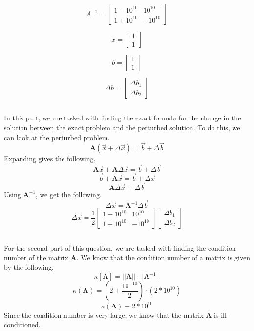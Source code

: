 \documentclass{article}
\begin{document}
\[
A^{-1} =
\begin{bmatrix}
    1-10^{10}& 10^{10} \\
    1+10^{10} & -10^{10}
\end{bmatrix}
\]

\[
x =
\begin{bmatrix}
    1 \\
    1
\end{bmatrix}
\]

\[
b =
\begin{bmatrix}
    1 \\
    1
\end{bmatrix}
\]

\[
\Delta b =
\begin{bmatrix}
    \Delta b_1 \\
    \Delta b_2
\end{bmatrix}
\]

\subsection{}
In this part, we are tasked with finding the exact formula for the change in the solution between the exact problem and the perturbed solution. To do this, we can look at the perturbed problem.
\[
\textbf{A}(\vec{x}+\Delta\vec{x}) = \vec{b} + \Delta\vec{b}
\]
Expanding gives the following.
\[
\textbf{A}\vec{x}+\textbf{A}\Delta\vec{x} = \vec{b} + \Delta\vec{b}
\]
\[
\vec{b}+\textbf{A}\vec{x} = \vec{b}+\Delta\vec{x}
\]
\[
\textbf{A}\Delta\vec{x} = \Delta\vec{b}
\]
Using \(\textbf{A}^{-1}\), we get the following.
\[
\Delta\vec{x} = \textbf{A}^{-1}\Delta\vec{b}
\]
\[
\Delta\vec{x}= \frac{1}{2}\begin{bmatrix}
    1-10^{10}& 10^{10} \\
    1+10^{10} & -10^{10}
\end{bmatrix}
\begin{bmatrix}
    \Delta b_1 \\
    \Delta b_2
\end{bmatrix}
\]

\subsection{}
For the second part of this question,  we are tasked with finding the condition number of the matrix \textbf{A}. We know that the condition number of a matrix is given by the following.
\[
\kappa[\textbf{A}] = ||\textbf{A}||\cdot||\textbf{A}^{-1}||
\]
\[
\kappa(\textbf{A}) = (2+\frac{10^{-10}}{2})\cdot(2*10^{10})
\]
\[
\kappa(\textbf{A}) = 2*10^{10}
\]
Since the condition number is very large, we know that the matrix \(\textbf{A}\) is ill-conditioned.
\end{document}
